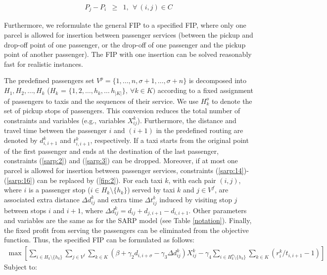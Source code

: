 \documentclass[preprint,authoryear,12pt]{elsarticle}
\begin{document}
\begin{eqnarray}
P_{j}-P_{i}&\geq& 1, ~~\forall~(i,j)\in C\label{fipg:20}
\end{eqnarray}

Furthermore, we reformulate the general FIP to a specified FIP, where only one parcel is allowed for insertion between passenger services (between the pickup and drop-off point of one passenger, or the drop-off of one passenger and the pickup point of another passenger). The FIP with one insertion can be solved reasonably fast for realistic instances.

The predefined passengers set $V^p=\{1,\ldots,n,\sigma+1,\ldots,\sigma+n\}$ is decomposed into $H_1,H_2,\ldots,H_k$ ($H_k$ = $\{1,2,\dots,h_{k},\dots\,h_{|K|}\},~\forall k\in K)$ according to a fixed assignment of passengers to taxis and the sequences of their service. We use $H_k^o$ to denote the set of pickup stops of passengers. This conversion reduces the total number of constraints and variables  (e.g., variables $X_{ij}^k$). Furthermore, the distance and travel time between the passenger $i$ and $(i+1)$ in the predefined routing are denoted by $d_{i,i+1}^k$ and $t_{i,i+1}^k$, respectively. If a taxi starts from the original point of the first passenger and ends at the destination of the last passenger, constraints (\ref{sarp:2}) and (\ref{sarp:3}) can be dropped. Moreover, if at most one parcel is allowed for insertion between passenger services, constraints (\ref{sarp:14})-(\ref{sarp:16}) can be replaced by (\ref{fip:2}). For each taxi $k$, with each pair $(i,j)$, where $i$ is a passenger stop ($i\in H_k\setminus \{h_k\}$) served by taxi $k$ and $j\in V^f$, are associated extra distance $\Delta d_{ij}^{k}$ and extra time $\Delta t_{ij}^{k} $ induced by visiting stop $j$ between stops $i$ and $i+1$, where $\Delta d_{ij}^{k} = d_{ij}+d_{j,i+1}-d_{i, i+1}$. Other parameters and variables are the same as for the SARP model (see Table \ref{notation}).
Finally, the fixed profit from serving the passengers can be eliminated from the objective function.  Thus, the specified FIP can be formulated as follows:
\begin{eqnarray}
\max\left[\sum\limits_{i\in H_k\setminus \{h_k\}}\sum\limits_{j\in V^f}\sum\limits_{k\in K}(\beta+\gamma_2 d_{i,i+\sigma}-\gamma_3 \Delta d_{ij}^{k})X_{ij}^{k}
-\gamma_4 \!\!\!\!\sum\limits_{i\in H_k^o\setminus \{h_k\}}\sum\limits_{k\in K} (r_i^k /t_{i,i+1}-1)\right] \label{fip}
 \end{eqnarray}
 Subject to:\\
\end{document}
